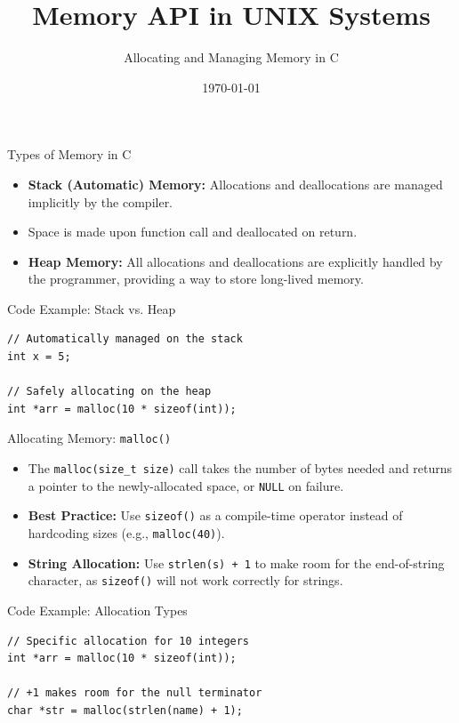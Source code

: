 \documentclass{beamer}
\title{Memory API in UNIX Systems}
\subtitle{Allocating and Managing Memory in C}
\author{}
\date{\today}
\begin{document}
\begin{frame}
    \titlepage
\end{frame}

\begin{frame}[fragile]{Types of Memory in C}
    \begin{itemize}
        \item \textbf{Stack (Automatic) Memory:} Allocations and deallocations are managed implicitly by the compiler. %
        \item Space is made upon function call and deallocated on return. %
        \item \textbf{Heap Memory:} All allocations and deallocations are explicitly handled by the programmer, providing a way to store long-lived memory. %
    \end{itemize}
    \vspace{0.3cm}
    \begin{block}{Code Example: Stack vs. Heap} %
\begin{verbatim}
// Automatically managed on the stack
int x = 5; 

// Safely allocating on the heap
int *arr = malloc(10 * sizeof(int)); 
\end{verbatim}
    \end{block}
\end{frame}

\begin{frame}[fragile]{Allocating Memory: \texttt{malloc()}}
    \begin{itemize}
        \item The \texttt{malloc(size\_t size)} call takes the number of bytes needed and returns a pointer to the newly-allocated space, or \texttt{NULL} on failure. %
        \item \textbf{Best Practice:} Use \texttt{sizeof()} as a compile-time operator instead of hardcoding sizes (e.g., \texttt{malloc(40)}). %
        \item \textbf{String Allocation:} Use \texttt{strlen(s) + 1} to make room for the end-of-string character, as \texttt{sizeof()} will not work correctly for strings. %
    \end{itemize}
    \vspace{0.3cm}
    \begin{block}{Code Example: Allocation Types} %
\begin{verbatim}
// Specific allocation for 10 integers
int *arr = malloc(10 * sizeof(int));

// +1 makes room for the null terminator
char *str = malloc(strlen(name) + 1);
\end{verbatim}
    \end{block}
\end{frame}
\end{document}

